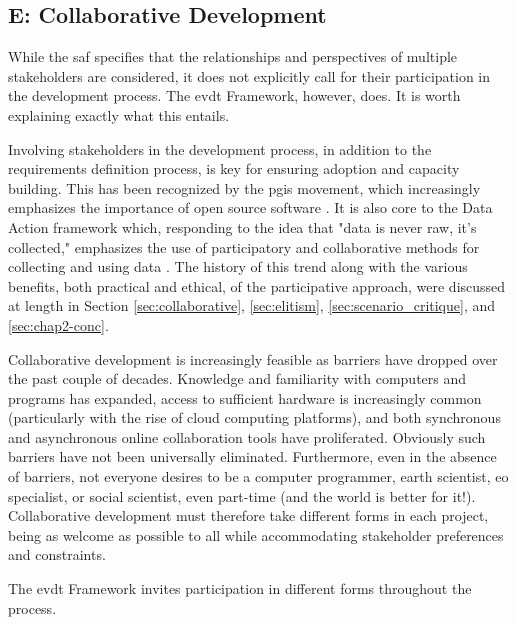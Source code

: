 \subsection{E: Collaborative Development} \label{sec:evdt-collab}

While the \ac{saf} specifies that the relationships and perspectives of multiple stakeholders are considered, it does not explicitly call for their participation in the development process. The \ac{evdt} Framework, however, does. It is worth explaining exactly what this entails.

Involving stakeholders in the development process, in addition to the requirements definition process, is key for ensuring adoption and capacity building. This has been recognized by the \ac{pgis} movement, which increasingly emphasizes the importance of open source software \cite{williamsonTheirworkDevelopmentSustainable2011, dodgeMappingModesMethods2011}. It is also core to the Data Action framework which, responding to the idea that "data is never raw, it's collected," emphasizes the use of participatory and collaborative methods for collecting and using data \cite{williamsDataActionUsing2020}. The history of this trend along with the various benefits, both practical and ethical, of the participative approach, were discussed at length in Section \ref{sec:collaborative}, \ref{sec:elitism}, \ref{sec:scenario_critique}, and \ref{sec:chap2-conc}.

Collaborative development is increasingly feasible as barriers have dropped over the past couple of decades. Knowledge and familiarity with computers and programs has expanded, access to sufficient hardware is increasingly common (particularly with the rise of cloud computing platforms), and both synchronous and asynchronous online collaboration tools have proliferated. Obviously such barriers have not been universally eliminated. Furthermore, even in the absence of barriers, not everyone desires to be a computer programmer, earth scientist, \ac{eo} specialist, or social scientist, even part-time (and the world is better for it!). Collaborative development must therefore take different forms in each project, being as welcome as possible to all while accommodating stakeholder preferences and constraints.

The \ac{evdt} Framework invites participation in different forms throughout the process.

